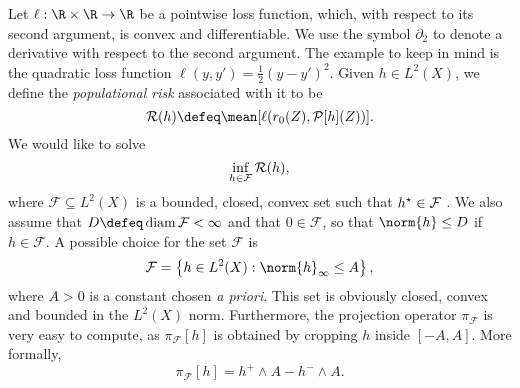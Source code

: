 Let $ \ell : \R \times \R \to \R $ be a pointwise loss function, which, with respect to its second argument, is convex and differentiable.
We use the symbol $ \partial_{ 2 } $ to denote a derivative with respect to the second argument.
The example to keep in mind is the quadratic loss function $ \ell ( y, y' ) = \frac{ 1 }{ 2 } ( y - y' )^2 $.
Given $ h \in L^{ 2 } ( X ) $, we define the \emph{populational risk} associated with it to be
\begin{equation*}
    \risk ( h ) \defeq \mean [ \ell ( r_{ 0 } ( Z ), \meanop [ h ] ( Z ) ) ]
.\end{equation*}
We would like to solve
\begin{equation*}
    \inf_{ h \in \mathcal{F} } \mathcal{R} ( h )
,\end{equation*}
where $ \mathcal{F} \subseteq L^{ 2 } ( X ) $ is a bounded, closed, convex set such that $ h^{ \star } \in \mathcal{F} $ .
We also assume that $ D \defeq \diam \mathcal{F} < \infty $ and that $ 0 \in \mathcal{F} $, so that $ \norm{ h } \leq D $ if $ h \in \mathcal{F} $.
A possible choice for the set $ \mathcal{F} $ is
\begin{equation*}
    \mathcal{F} = \left\{ h \in L^{ 2 } ( X ) : \norm{ h }_{ \infty } \leq A \right\}
,\end{equation*}
where $ A > 0 $ is a constant chosen \emph{a priori}.
This set is obviously closed, convex and bounded in the $ L^2 ( X ) $ norm.
Furthermore, the projection operator $ \pi_{ \mathcal{F} } $ is very easy to compute, as $ \pi_{ \mathcal{F} } [ h ] $ is obtained by cropping $ h $ inside $ [ -A, A ] $.
More formally,
\begin{equation*}
    \pi_{ \mathcal{F} } [ h ] = h^{ + } \wedge A - h^{ - } \wedge A
.\end{equation*}

